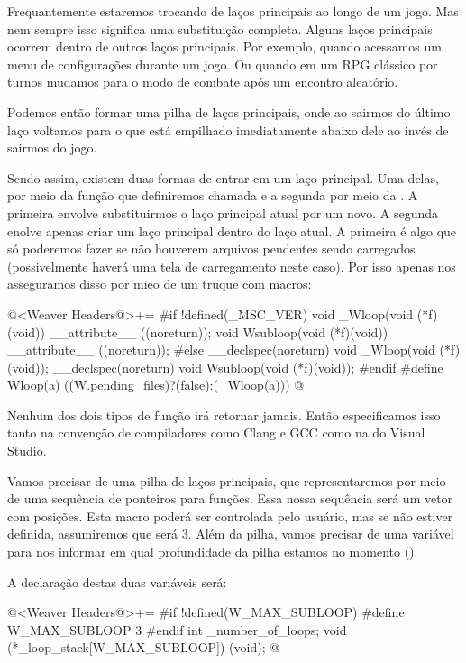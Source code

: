 
Frequantemente estaremos trocando de laços principais ao longo de um
jogo. Mas nem sempre isso significa uma substituição completa. Alguns
laços principais ocorrem dentro de outros laços principais. Por
exemplo, quando acessamos um menu de configurações durante um jogo. Ou
quando em um RPG clássico por turnos mudamos para o modo de combate
após um encontro aleatório.

Podemos então formar uma pilha de laços principais, onde ao sairmos do
último laço voltamos para o que está empilhado imediatamente abaixo
dele ao invés de sairmos do jogo.

Sendo assim, existem duas formas de entrar em um laço principal. Uma
delas, por meio da função que definiremos chamada  e
a segunda por meio da . A primeira envolve
substituirmos o laço principal atual por um novo. A segunda enolve
apenas criar um laço principal dentro do laço atual. A primeira é algo
que só poderemos fazer se não houverem arquivos pendentes sendo
carregados (possivelmente haverá uma tela de carregamento neste
caso). Por isso apenas nos asseguramos disso por mieo de um truque com
macros:

\iniciocodigo
@<Weaver Headers@>+=
#if !defined(_MSC_VER)
void _Wloop(void (*f)(void)) __attribute__ ((noreturn));
void Wsubloop(void (*f)(void)) __attribute__ ((noreturn));
#else
__declspec(noreturn) void _Wloop(void (*f)(void));
__declspec(noreturn) void Wsubloop(void (*f)(void));
#endif
#define Wloop(a) ((W.pending_files)?(false):(_Wloop(a)))
@
\fimcodigo

Nenhum dos dois tipos de função irá retornar jamais. Então
especificamos isso tanto na convenção de compiladores como Clang e GCC
como na do Visual Studio.

Vamos precisar de uma pilha de laços principais, que representaremos
por meio de uma sequência de ponteiros para funções. Essa nossa
sequência será um vetor com 
posições. Esta macro poderá ser controlada pelo usuário, mas se não
estiver definida, assumiremos que será 3. Além da pilha, vamos
precisar de uma variável para nos informar em qual profundidade da
pilha estamos no momento ().

A declaração destas duas variáveis será:

\iniciocodigo
@<Weaver Headers@>+=
#if !defined(W_MAX_SUBLOOP)
#define W_MAX_SUBLOOP 3
#endif
int _number_of_loops;
void (*_loop_stack[W_MAX_SUBLOOP]) (void);
@
\fimcodigo


